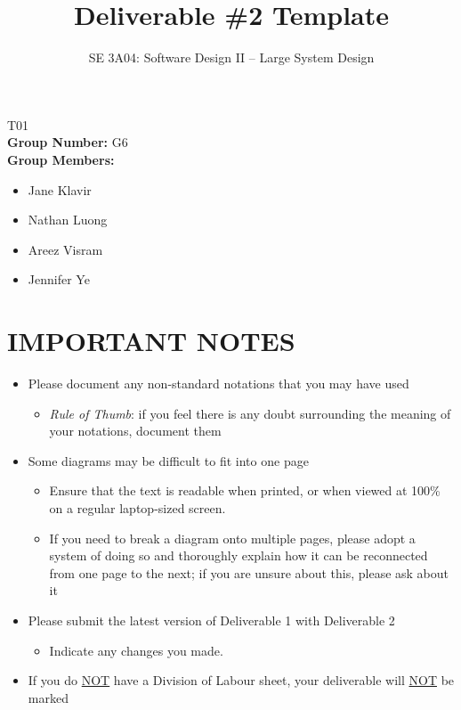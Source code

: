 \documentclass[]{article}
\title{Deliverable \#2 Template}
\author{SE 3A04: Software Design II -- Large System Design}
\date{}
\begin{document}
\maketitle	
{} T01\\
{\bf Group Number:} G6 \\
{\bf Group Members:} 
\begin{itemize}
	\item Jane Klavir
	\item Nathan Luong
	\item Areez Visram
	\item Jennifer Ye
\end{itemize}

\section*{IMPORTANT NOTES}
\begin{itemize}
	\item Please document any non-standard notations that you may have used
	\begin{itemize}
		\item \emph{Rule of Thumb}: if you feel there is any doubt surrounding the meaning of your notations, document them
	\end{itemize}
	\item Some diagrams may be difficult to fit into one page
	\begin{itemize}
		\item Ensure that the text is readable when printed, or when viewed at 100\% on a regular laptop-sized screen.
		\item If you need to break a diagram onto multiple pages, please adopt a system of doing so and thoroughly explain how it can be reconnected from one page to the next; if you are unsure about this, please ask about it
	\end{itemize}
	\item Please submit the latest version of Deliverable 1 with Deliverable 2
	\begin{itemize}
		\item Indicate any changes you made.
	\end{itemize}
	\item If you do \underline{NOT} have a Division of Labour sheet, your deliverable will \underline{NOT} be marked
\end{itemize}
\end{document}
